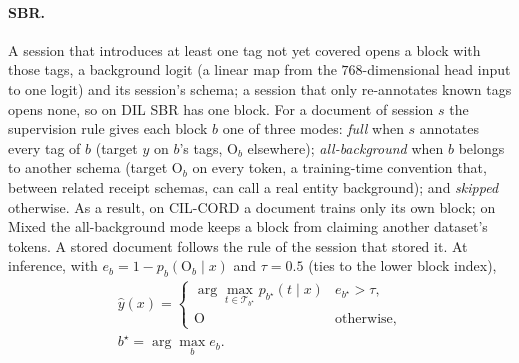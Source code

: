 \paragraph{SBR.} A session that introduces at least one tag not yet covered opens a block with those tags, a background logit (a linear map from the $768$-dimensional head input to one logit) and its session's schema; a session that only re-annotates known tags opens none, so on DIL SBR has one block. For a document of session $s$ the supervision rule gives each block $b$ one of three modes: \emph{full} when $s$ annotates every tag of $b$ (target $y$ on $b$'s tags, $\mathrm{O}_b$ elsewhere); \emph{all-background} when $b$ belongs to another schema (target $\mathrm{O}_b$ on every token, a training-time convention that, between related receipt schemas, can call a real entity background); and \emph{skipped} otherwise. As a result, on CIL-CORD a document trains only its own block; on Mixed the all-background mode keeps a block from claiming another dataset's tokens. A stored document follows the rule of the session that stored it. At inference, with $e_b=1-p_b(\mathrm{O}_b\mid x)$ and $\tau{=}0.5$ (ties to the lower block index),
\begin{equation}
\begin{gathered}
\hat y(x)=\begin{cases}\arg\max_{t\in\mathcal{T}_{b^\star}}p_{b^\star}(t\mid x) & e_{b^\star}>\tau,\\ \mathrm{O} & \text{otherwise,}\end{cases}\\
b^\star=\arg\max_b e_b.
\end{gathered}
\label{eq:infer}
\end{equation}

